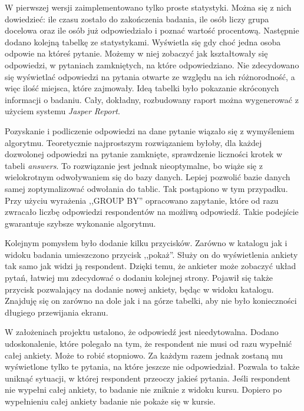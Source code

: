 W pierwszej wersji zaimplementowano tylko proste statystyki. Można się z nich dowiedzieć: ile czasu zostało do zakończenia badania, ile osób liczy grupa docelowa oraz ile osób już odpowiedziało i poznać wartość procentową. Następnie dodano kolejną tabelkę ze statystykami. Wyświetla się gdy choć jedna osoba odpowie na któreś pytanie. Możemy w niej zobaczyć jak kształtowały się odpowiedzi, w pytaniach zamkniętych, na które odpowiedziano. Nie zdecydowano się wyświetlać odpowiedzi na pytania otwarte ze względu na ich różnorodność, a więc ilość miejsca, które zajmowały. Ideą tabelki było pokazanie skróconych informacji o badaniu. Cały, dokładny, rozbudowany raport można wygenerować z użyciem systemu \emph{Jasper Report}.

Pozyskanie i podliczenie odpowiedzi na dane pytanie wiązało się z wymyśleniem algorytmu. Teoretycznie najprostszym rozwiązaniem byłoby, dla każdej dozwolonej odpowiedzi na pytanie zamknięte, sprawdzenie liczności krotek w tabeli \emph{answers}. To rozwiązanie jest jednak nieoptymalne, bo wiąże się z wielokrotnym odwoływaniem się do bazy danych. Lepiej pozwolić bazie danych samej zoptymalizować odwołania do tablic. Tak postąpiono w tym przypadku. Przy użyciu wyrażenia ,,GROUP BY'' opracowano zapytanie, które od razu zwracało liczbę odpowiedzi respondentów na możliwą odpowiedź. Takie podejście gwarantuje szybsze wykonanie algorytmu.

Kolejnym pomysłem było dodanie kilku przycisków. Zarówno w katalogu jak i widoku badania umieszczono przycisk ,,pokaż''. Służy on do wyświetlenia ankiety tak samo jak widzi ją respondent. Dzięki temu, że ankieter może zobaczyć układ pytań, łatwiej mu zdecydować o dodaniu kolejnej strony. Pojawił się także przycisk pozwalający na dodanie nowej ankiety, będąc w widoku katalogu. Znajduję się on zarówno na dole jak i na górze tabelki, aby nie było konieczności długiego przewijania ekranu.

W założeniach projektu ustalono, że odpowiedź jest nieedytowalna. Dodano udoskonalenie, które polegało na tym, że respondent nie musi od razu wypełnić całej ankiety. Może to robić stopniowo. Za każdym razem jednak zostaną mu wyświetlone tylko te pytania, na które jeszcze nie odpowiedział. Pozwala to także uniknąć sytuacji, w której respondent przeoczy jakieś pytania. Jeśli respondent nie wypełni całej ankiety, to badanie nie zniknie z widoku kursu. Dopiero po wypełnieniu całej ankiety badanie nie pokaże się w kursie.


%

